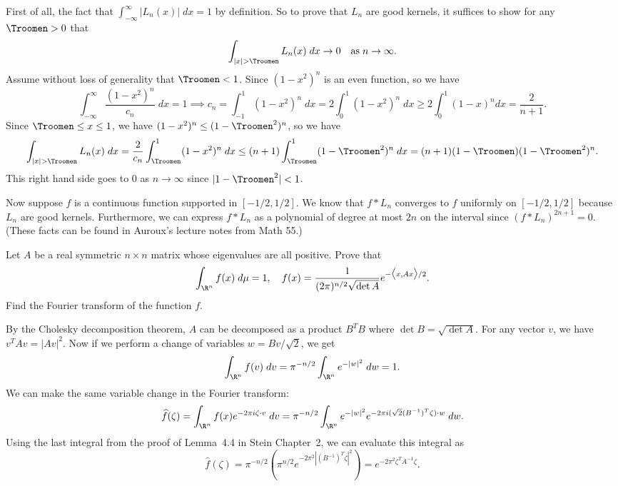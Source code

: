 \documentclass[11pt,letterpaper]{article}
\begin{document}
\begin{solution}
    \tengwarannatar
    \quad First of all, the fact that $\int^\infty_{-\infty} |L_n(x)|\;dx = 1$ by definition. So to prove that $L_n$ are good kernels, it suffices to show for any $\text{\Troomen}>0$ that
    \[
        \int_{|x|>\text{\Troomen}} L_n(x)\;dx \to 0\quad \text{as}\;n\to \infty
    .\] 
    Assume without loss of generality that $\text{\Troomen} < 1$. Since $(1-x^2)^n$ is an even function, so we have
    \[
        \int_{-\infty}^\infty \frac{(1-x^2)^n}{c_n}\;dx = 1 \implies c_n = \int^1_{-1} (1-x^2)^n\;dx = 2\int_0^1(1-x^2)^n\;dx \geq 2\int_0^1 (1-x)^ndx = \frac{2}{n+1}
    .\] 
    Since $\text{\Troomen} \leq x \leq 1$, we have $(1-x^2)^n \leq (1-\text{\Troomen}^2)^n$, so we have
    \[
        \int_{|x| > \text{\Troomen}} L_n(x)\;dx = \frac{2}{c_n}\int_{\text{\Troomen}}^1 (1-x^2)^n\;dx \leq (n+1)\int_{\text{\Troomen}}^1 (1-\text{\Troomen}^2)^n\; dx = (n+1)(1-\text{\Troomen})(1-\text{\Troomen}^2)^n
    .\] 
    This right hand side goes to $0$ as $n\to \infty$ since $|1-\text{\Troomen}^2| < 1$.

    \quad Now suppose $f$ is a continuous function supported in $[-1 /2, 1 /2]$. We know that $f * L_n$ converges to $f$ uniformly on $[-1 /2, 1 /2]$ because $L_n$ are good kernels. Furthermore, we can express $f * L_n$ as a polynomial of degree at most $2n$ on the interval since $(f * L_n)^{2n + 1} = 0$. (These facts can be found in Auroux's lecture notes from Math 55.)
\end{solution}

\begin{problem}
    Let $A$ be a real symmetric $n\times n$ matrix whose eigenvalues are all positive. Prove that
    \[
        \int_{\R^n} f(x) \;d\mu = 1,\quad f(x)=\frac{1}{(2\pi)^{n /2}\sqrt{\det A}}e^{-\big\langle x, Ax \big\rangle / 2}
    .\] 
    Find the Fourier transform of the function $f$.
\end{problem}

\begin{solution}
    \quad By the Cholesky decomposition theorem, $A$ can be decomposed as a product $B^T B$ where $\det B = \sqrt{\det A}$. For any vector $v$, we have $v^T A v = |Av|^2$. Now if we perform a change of variables $w = Bv / \sqrt{2}$, we get
    \[
        \int_{\R^n} f(v)\;dv = \pi^{-n /2}\int_{\R^n} e^{-|w|^2}\;dw = 1
    .\] 
    We can make the same variable change in the Fourier transform:
    \[
        \widehat{f}(\zeta) = \int_{\R^n} f(x)e^{-2\pi i \zeta \cdot v}\;dv = \pi^{-n /2}\int_{\R^n} e^{-|w|^2}e^{-2\pi i (\sqrt{2}(B^{-1})^T\zeta)\cdot w}\;dw
    .\] 
    Using the last integral from the proof of Lemma~4.4 in Stein Chapter~2, we can evaluate this integral as
    \[
        \widehat{f}(\zeta) = \pi^{-n/2}(\pi^{n/2}e^{-2\pi^2|(B^{-1})^T\zeta|^2}) = e^{-2\pi^2\zeta^TA^{-1}\zeta}
    .\] 
\end{solution}
\end{document}
